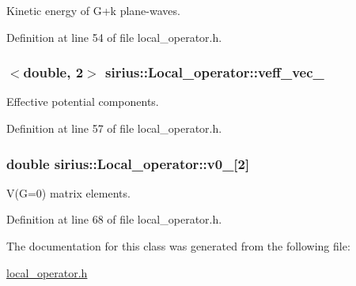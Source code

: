 Kinetic energy of G+k plane-\/waves. 



Definition at line 54 of file local\+\_\+operator.\+h.

\hypertarget{classsirius_1_1_local__operator_a2b0378568482509732db3952f4dc00c4}{}
\subsubsection[{veff\+\_\+vec\+\_\+}]{$<$double, 2$>$ sirius\+::\+Local\+\_\+operator\+::veff\+\_\+vec\+\_\+\hspace{0.3cm}{\ttfamily [private]}}\label{classsirius_1_1_local__operator_a2b0378568482509732db3952f4dc00c4}


Effective potential components. 



Definition at line 57 of file local\+\_\+operator.\+h.

\hypertarget{classsirius_1_1_local__operator_acc6455d5cfa6b34e9abaa13fa9349e10}{}
\subsubsection[{v0\+\_\+}]{\setlength{\rightskip}{0pt plus 5cm}double sirius\+::\+Local\+\_\+operator\+::v0\+\_\+\mbox{[}2\mbox{]}\hspace{0.3cm}{\ttfamily [private]}}\label{classsirius_1_1_local__operator_acc6455d5cfa6b34e9abaa13fa9349e10}


V(G=0) matrix elements. 



Definition at line 68 of file local\+\_\+operator.\+h.



The documentation for this class was generated from the following file\+:\begin{DoxyCompactItemize}
\item 
\hyperlink{local__operator_8h}{local\+\_\+operator.\+h}\end{DoxyCompactItemize}

